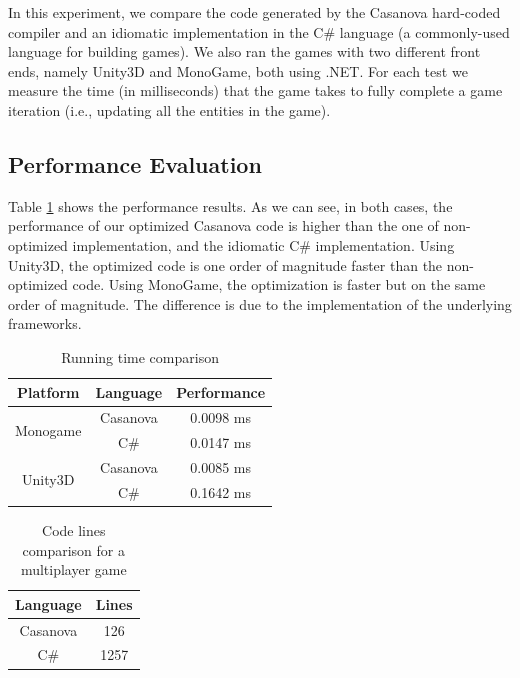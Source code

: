In this experiment, we compare the code generated by the Casanova hard-coded compiler and an idiomatic implementation in the C\# language (a commonly-used language for building games). We also ran the games with two different front ends, namely Unity3D and MonoGame, both using .NET.
For each test we measure the time (in milliseconds) that the game takes to fully complete a game iteration (i.e., updating all the entities in the game).

\subsection{Performance Evaluation} Table \ref{tab:ch_networking_times} shows the performance results. As we can see, in both cases, the performance of our optimized Casanova code is higher than the one of non-optimized implementation, and the idiomatic C\# implementation. Using Unity3D, the optimized code is one order of magnitude faster than the non-optimized code. Using MonoGame, the optimization is faster but on the same order of magnitude. The difference is due to the implementation of the underlying frameworks.

\begin{table}
\centering
\begin{tabular}{|c|c|c|}
\hline
 Platform & Language & Performance\\ \hline
\multirow{2}{*}{Monogame}
  & Casanova & 0.0098 ms\\
  & C\# & 0.0147 ms\\ \hline
\multirow{2}{*}{Unity3D}
  & Casanova & 0.0085 ms\\
  & C\# & 0.1642 ms\\ 
  \hline
\end{tabular}
\caption{Running time comparison}
\label{tab:ch_networking_times}
\end{table}

\begin{table}
\centering
\begin{tabular}{|c|c|}
	\hline
	Language & Lines \\ \hline
	Casanova & 126 \\
	\hline
	C\# &  1257 \\
	\hline
\end{tabular}
\caption{Code lines comparison for a multiplayer game}
\label{tab:ch_networking_length}
\end{table}

